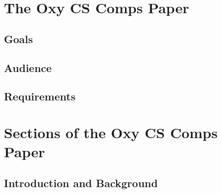 \documentclass[10pt,twocolumn]{article}
\begin{document}

\section{The Oxy CS Comps Paper}

\subsection{Goals}

\subsection{Audience}

\subsection{Requirements}

\section{Sections of the Oxy CS Comps Paper}

\subsection{Introduction and Background}
\end{document}
